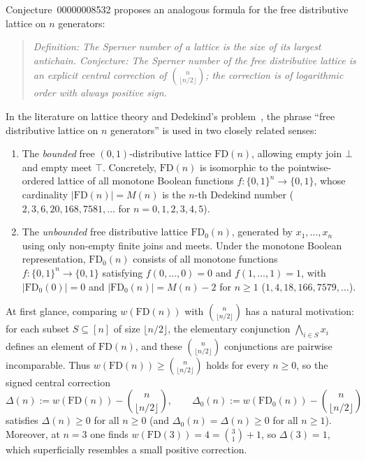 \documentclass[11pt]{article}
\theoremstyle{definition}
\newcommand{\FD}{\mathrm{FD}}
\newcommand{\FDz}{\mathrm{FD}_0}
\begin{document}
Conjecture~00000008532 proposes an analogous formula for the free distributive lattice on $n$ generators:
\begin{quote}
\emph{Definition: The Sperner number of a lattice is the size of its largest antichain. Conjecture: The Sperner number of the free distributive lattice is an explicit central correction of $\binom{n}{\lfloor n/2 \rfloor}$; the correction is of logarithmic order with always positive sign.}
\end{quote}

In the literature on lattice theory and Dedekind's problem~\cite{Dedekind1897,Birkhoff1937,Kleitman1969,Engel1997}, the phrase ``free distributive lattice on $n$ generators'' is used in two closely related senses:
\begin{enumerate}
  \item The \emph{bounded} free $(0,1)$-distributive lattice $\FD(n)$, allowing empty join $\bot$ and empty meet $\top$. Concretely, $\FD(n)$ is isomorphic to the pointwise-ordered lattice of all monotone Boolean functions $f : \{0,1\}^n \to \{0,1\}$, whose cardinality $|\FD(n)| = M(n)$ is the $n$-th Dedekind number ($2, 3, 6, 20, 168, 7581, \dots$ for $n = 0, 1, 2, 3, 4, 5$).
  \item The \emph{unbounded} free distributive lattice $\FDz(n)$, generated by $x_1, \dots, x_n$ using only non-empty finite joins and meets. Under the monotone Boolean representation, $\FDz(n)$ consists of all monotone functions $f : \{0,1\}^n \to \{0,1\}$ satisfying $f(0,\dots,0) = 0$ and $f(1,\dots,1) = 1$, with $|\FDz(0)| = 0$ and $|\FDz(n)| = M(n) - 2$ for $n \ge 1$ ($1, 4, 18, 166, 7579, \dots$).
\end{enumerate}

At first glance, comparing $w(\FD(n))$ with $\binom{n}{\lfloor n/2 \rfloor}$ has a natural motivation: for each subset $S \subseteq [n]$ of size $\lfloor n/2 \rfloor$, the elementary conjunction $\bigwedge_{i \in S} x_i$ defines an element of $\FD(n)$, and these $\binom{n}{\lfloor n/2 \rfloor}$ conjunctions are pairwise incomparable. Thus $w(\FD(n)) \ge \binom{n}{\lfloor n/2 \rfloor}$ holds for every $n \ge 0$, so the signed central correction
\[
  \Delta(n) := w(\FD(n)) - \binom{n}{\lfloor n/2 \rfloor}, \qquad
  \Delta_0(n) := w(\FDz(n)) - \binom{n}{\lfloor n/2 \rfloor}
\]
satisfies $\Delta(n) \ge 0$ for all $n \ge 0$ (and $\Delta_0(n) = \Delta(n) \ge 0$ for all $n \ge 1$). Moreover, at $n = 3$ one finds $w(\FD(3)) = 4 = \binom{3}{1} + 1$, so $\Delta(3) = 1$, which superficially resembles a small positive correction.
\end{document}
